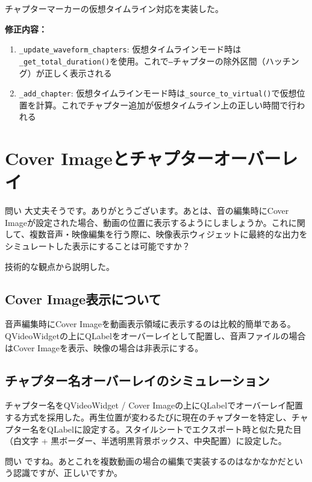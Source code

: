 \documentclass[10pt,a4paper,twocolumn]{article}
\begin{document}
チャプターマーカーの仮想タイムライン対応を実装した。

\textbf{修正内容：}
\begin{enumerate}
    \item \texttt{\_update\_waveform\_chapters}: 仮想タイムラインモード時は\texttt{\_get\_total\_duration()}を使用。これで\texttt{--}チャプターの除外区間（ハッチング）が正しく表示される
    \item \texttt{\_add\_chapter}: 仮想タイムラインモード時は\texttt{\_source\_to\_virtual()}で仮想位置を計算。これでチャプター追加が仮想タイムライン上の正しい時間で行われる
\end{enumerate}

\section{Cover Imageとチャプターオーバーレイ}

\begin{itembox}[l]{問い}
大丈夫そうです。ありがとうございます。あとは、音の編集時にCover Imageが設定された場合、動画の位置に表示するようにしましょうか。これに関して、複数音声・映像編集を行う際に、映像表示ウィジェットに最終的な出力をシミュレートした表示にすることは可能ですか？
\end{itembox}

技術的な観点から説明した。

\subsection{Cover Image表示について}
音声編集時にCover Imageを動画表示領域に表示するのは比較的簡単である。QVideoWidgetの上にQLabelをオーバーレイとして配置し、音声ファイルの場合はCover Imageを表示、映像の場合は非表示にする。

\subsection{チャプター名オーバーレイのシミュレーション}
チャプター名をQVideoWidget / Cover Imageの上にQLabelでオーバーレイ配置する方式を採用した。再生位置が変わるたびに現在のチャプターを特定し、チャプター名をQLabelに設定する。スタイルシートでエクスポート時と似た見た目（白文字 + 黒ボーダー、半透明黒背景ボックス、中央配置）に設定した。

\begin{itembox}[l]{問い}
ですね。あとこれを複数動画の場合の編集で実装するのはなかなかだという認識ですが、正しいですか。
\end{itembox}
\end{document}
